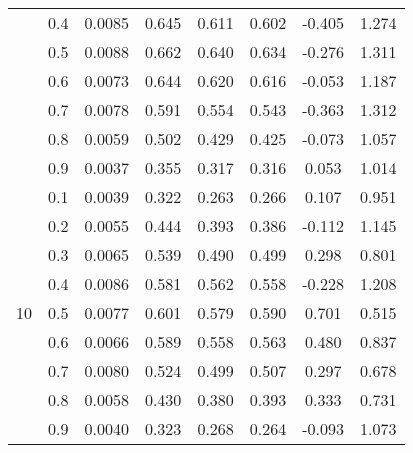 \documentclass[11pt,a4paper]{report}
\begin{document}
\begin{longtable}{ | c | c || c | c | c | c | c | c | }
 & 0.4 & 0.0085 & 0.645 & 0.611 & 0.602 & -0.405 & 1.274 \\
 & 0.5 & 0.0088 & 0.662 & 0.640 & 0.634 & -0.276 & 1.311 \\
 & 0.6 & 0.0073 & 0.644 & 0.620 & 0.616 & -0.053 & 1.187 \\
 & 0.7 & 0.0078 & 0.591 & 0.554 & 0.543 & -0.363 & 1.312 \\
 & 0.8 & 0.0059 & 0.502 & 0.429 & 0.425 & -0.073 & 1.057 \\
 & 0.9 & 0.0037 & 0.355 & 0.317 & 0.316 & 0.053 & 1.014 \\
 \hline
\multirow{9}{*}{10} & 0.1 & 0.0039 & 0.322 & 0.263 & 0.266 & 0.107 & 0.951 \\
 & 0.2 & 0.0055 & 0.444 & 0.393 & 0.386 & -0.112 & 1.145 \\
 & 0.3 & 0.0065 & 0.539 & 0.490 & 0.499 & 0.298 & 0.801 \\
 & 0.4 & 0.0086 & 0.581 & 0.562 & 0.558 & -0.228 & 1.208 \\
 & 0.5 & 0.0077 & 0.601 & 0.579 & 0.590 & 0.701 & 0.515 \\
 & 0.6 & 0.0066 & 0.589 & 0.558 & 0.563 & 0.480 & 0.837 \\
 & 0.7 & 0.0080 & 0.524 & 0.499 & 0.507 & 0.297 & 0.678 \\
 & 0.8 & 0.0058 & 0.430 & 0.380 & 0.393 & 0.333 & 0.731 \\
 & 0.9 & 0.0040 & 0.323 & 0.268 & 0.264 & -0.093 & 1.073 \\
 \hline
\hline
\end{longtable}
\end{document}

